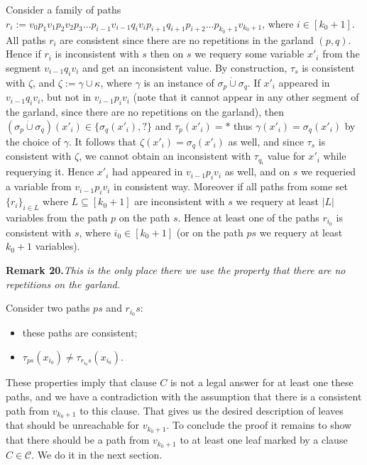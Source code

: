 \documentclass[10pt,a4paper]{article}
\newcommand{\joint}{\mathbin{\dot\cup}}
\newenvironment{result}[1]{\par\medskip\noindent\textbf{#1.}\itshape}{\par\medskip}
\begin{document}
Consider a family of paths $r_i:=v_0p_1v_1p_2v_2p_3\ldots p_{i-1}v_{i-1}q_iv_ip_{i+1}q_{i+1}p_{i+2}\ldots p_{k_0+1}v_{k_0+1}$, where $i\in[k_0+1]$. All paths $r_i$ are consistent since there are no repetitions in the garland $(p,q)$. Hence if $r_i$ is inconsistent with $s$ then on $s$ we requery some variable $x'_i$ from the segment $v_{i-1}q_iv_i$ and get an inconsistent value.
By construction, $\tau_s$ is consistent with $\zeta$, and $\zeta:=\gamma\cup\kappa$, where $\gamma$ is an instance of $\sigma_p\joint\sigma_q$. If $x'_i$ appeared in $v_{i-1}q_iv_i$, but not in $v_{i-1}p_iv_i$ (note that it cannot appear in any other segment of the garland, since there are no repetitions on the garland), then $(\sigma_p\joint\sigma_q)(x'_i)\in\{\sigma_q(x'_i),?\}$ and $\tau_p(x'_i)=*$ thus $\gamma(x'_i)=\sigma_q(x'_i)$ by the choice of $\gamma$. It follows that $\zeta(x'_i)=\sigma_q(x'_i)$ as well, and since $\tau_s$ is consistent with $\zeta$, we cannot obtain an inconsistent with $\tau_{q_i}$ value for $x'_i$ while requerying it. Hence $x'_i$ had appeared in $v_{i-1}p_iv_i$ as well, and on $s$ we requeried a variable from $v_{i-1}p_iv_i$ in consistent way. Moreover if all paths from some set $\{r_i\}_{i\in L}$ where $L\subseteq[k_0+1]$ are inconsistent with $s$ we requery at least $|L|$ variables from the path $p$ on the path $s$. Hence at least one of the paths $r_{i_0}$ is consistent with $s$, where $i_0\in[k_0+1]$ (or on the path $ps$ we requery at least $k_0+1$ variables).
\begin{result}{Remark 20}This is the only place there we use the property that there are no repetitions on the garland.\end{result}
Consider two paths $ps$ and $r_{i_0}s$:
\begin{itemize}\item these paths are consistent;
\item $\tau_{ps}(x_{i_0})\ne\tau_{r_{i_0}s}(x_{i_0})$.\end{itemize}
These properties imply that clause $C$ is not a legal answer for at least one these paths, and we have a contradiction with the assumption that there is a consistent path from $v_{k_0+1}$ to this clause. That gives us the desired description of leaves that should be unreachable for $v_{k_0+1}$.
To conclude the proof it remains to show that there should be a path from $v_{k_0+1}$ to at least one leaf marked by a clause $C\in\mathcal C$. We do it in the next section.
\end{document}
